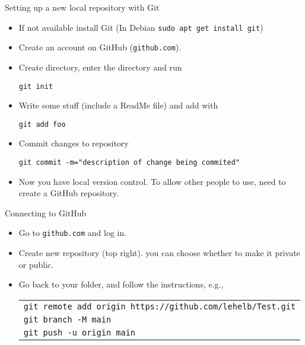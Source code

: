 \documentclass{beamer}
\begin{document}
\begin{frame}{Setting up a new local repository with Git}
  \begin{itemize}
  \item If not available install Git (In Debian \texttt{sudo apt get install git})
\item Create an account on GitHub (\texttt{github.com}).
\item Create directory, enter the directory and run \\
  \begin{center}
    \texttt{git init}
  \end{center}
\item Write some stuff (include a ReadMe file) and add with \\
  \begin{center}    
\texttt{git add foo} 
  \end{center}
\item Commit changes to repository\\\begin{center} \texttt{git commit -m="description of change being commited"}\end{center}
\item Now you have local version control. To allow other people to use, need  to create a GitHub repository.
  \end{itemize}
 \end{frame}

 \begin{frame}{Connecting to GitHub}
   \begin{itemize}
   \item Go to \texttt{github.com} and log in.
   \item Create new repository (top right). you can choose whether to make it private or public.
   \item Go back to your folder, and follow the instructions, e.g.,\\
     \begin{center}
       \begin{tabular}{l}
       \texttt{git remote add origin https://github.com/lehelb/Test.git}\\
       \texttt{git branch -M main}\\
       \texttt{git push -u origin main}         
       \end{tabular}
     \end{center}
   \end{itemize}
 \end{frame}
\end{document}
